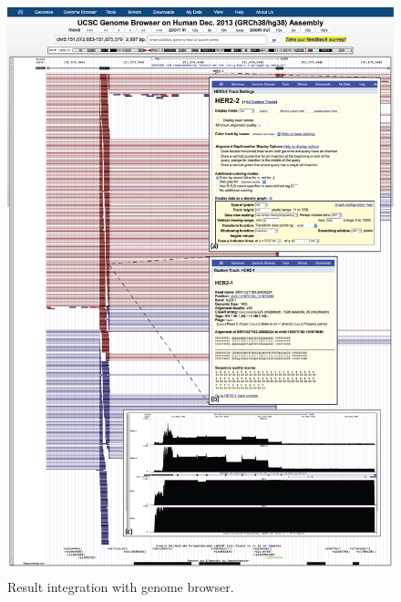 \begin{figure}[!p]
\centering
\includegraphics[width=1\textwidth]{images/result_genome_browser}
\caption[Result integration with genome browser]{
    Result integration with genome browser.
}
\label{fig:result-genome-browser}
\end{figure}

